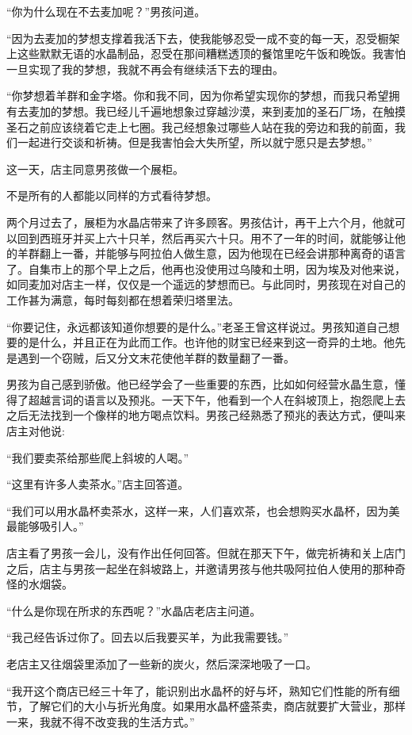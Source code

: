 \documentclass[twoside,openany]{book}
\begin{document}
“你为什么现在不去麦加呢？”男孩问道。

“因为去麦加的梦想支撑着我活下去，使我能够忍受一成不变的每一天，忍受橱架上这些默默无语的水晶制品，忍受在那间糟糕透顶的餐馆里吃午饭和晚饭。我害怕一旦实现了我的梦想，我就不再会有继续活下去的理由。

“你梦想着羊群和金字塔。你和我不同，因为你希望实现你的梦想，而我只希望拥有去麦加的梦想。我已经儿千遍地想象过穿越沙漠，来到麦加的圣石厂场，在触摸圣石之前应该绕着它走上七圈。我己经想象过哪些人站在我的旁边和我的前面，我们一起进行交谈和祈祷。但是我害怕会大失所望，所以就宁愿只是去梦想。”

这一天，店主同意男孩做一个展柜。

不是所有的人都能以同样的方式看待梦想。

两个月过去了，展柜为水晶店带来了许多顾客。男孩估计，再干上六个月，他就可以回到西班牙并买上六十只羊，然后再买六十只。用不了一年的时间，就能够让他的羊群翻上一番，并能够与阿拉伯人做生意，因为他现在已经会讲那种离奇的语言了。自集市上的那个早上之后，他再也没使用过乌陵和土明，因为埃及对他来说，如同麦加对店主一样，仅仅是一个遥远的梦想而已。与此同时，男孩现在对自己的工作甚为满意，每时每刻都在想着荣归塔里法。

“你要记住，永远都该知道你想要的是什么。”老圣王曾这样说过。男孩知道自己想要的是什么，并且正在为此而工作。也许他的财宝已经来到这一奇异的土地。他先是遇到一个窃贼，后又分文末花使他羊群的数量翻了一番。

男孩为自己感到骄傲。他已经学会了一些重要的东西，比如如何经营水晶生意，懂得了超越言词的语言以及预兆。一天下午，他看到一个人在斜坡顶上，抱怨爬上去之后无法找到一个像样的地方喝点饮料。男孩己经熟悉了预兆的表达方式，便叫来店主对他说:

“我们要卖茶给那些爬上斜坡的人喝。”

“这里有许多人卖茶水。”店主回答道。

“我们可以用水晶杯卖茶水，这样一来，人们喜欢茶，也会想购买水晶杯，因为美最能够吸引人。”

店主看了男孩一会儿，没有作出任何回答。但就在那天下午，做完祈祷和关上店门之后，店主与男孩一起坐在斜坡路上，并邀请男孩与他共吸阿拉伯人使用的那种奇怪的水烟袋。

“什么是你现在所求的东西呢？”水晶店老店主问道。

“我己经告诉过你了。回去以后我要买羊，为此我需要钱。”

老店主又往烟袋里添加了一些新的炭火，然后深深地吸了一口。

“我开这个商店已经三十年了，能识别出水晶杯的好与坏，熟知它们性能的所有细节，了解它们的大小与折光角度。如果用水晶杯盛茶卖，商店就要扩大营业，那样一来，我就不得不改变我的生活方式。”
\end{document}
